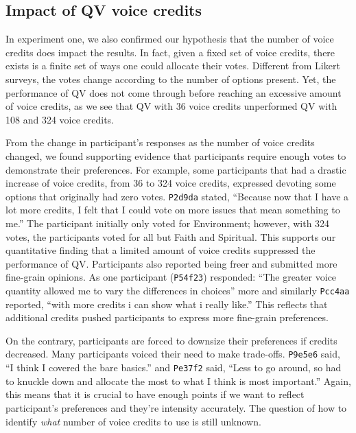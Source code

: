 \subsection{Impact of QV voice credits}
In experiment one, we also confirmed our hypothesis that the number of voice credits does impact the results. 
In fact, given a fixed set of voice credits, there exists is a finite set of ways one could allocate their votes. 
Different from Likert surveys, the votes change according to the number of options present.
Yet, the performance of QV does not come through before reaching an excessive amount of voice credits, as we see that QV with 36 voice credits unperformed QV with 108 and 324 voice credits.

From the change in participant's responses as the number of voice credits changed, we found supporting evidence that participants require enough votes to demonstrate their preferences.
For example, some participants that had a drastic increase of voice credits, from 36 to 324 voice credits, expressed devoting some options that originally had zero votes. 
\texttt{P2d9da} stated, ``Because now that I have a lot more credits, I felt that I could vote on more issues that mean something to me.'' The participant initially only voted for Environment; however, with 324 votes, the participants voted for all but Faith and Spiritual. This supports our quantitative finding that a limited amount of voice credits suppressed the performance of QV. Participants also reported being freer and submitted more fine-grain opinions. As one participant (\texttt{P54f23}) responded: ``The greater voice quantity allowed me to vary the differences in choices'' more and similarly \texttt{Pcc4aa} reported, ``with more credits i can show what i really like.''
This reflects that additional credits pushed participants to express more fine-grain preferences.

On the contrary, participants are forced to downsize their preferences if credits decreased. Many participants voiced their need to make trade-offs. \texttt{P9e5e6} said, ``I think I covered the bare basics.'' and \texttt{Pe37f2} said, ``Less to go around, so had to knuckle down and allocate the most to what I think is most important.'' 
Again, this means that it is crucial to have enough points if we want to reflect participant's preferences and they're intensity accurately.
The question of how to identify \textit{what} number of voice credits to use is still unknown.

